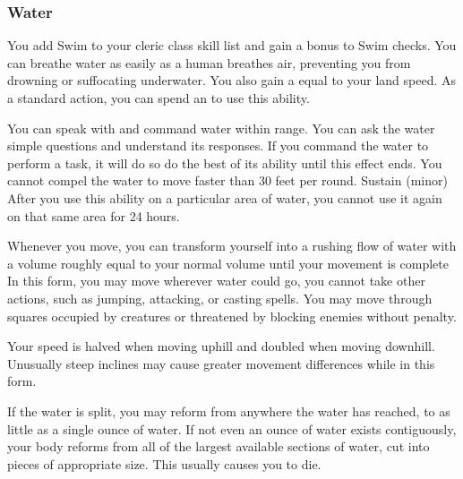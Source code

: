         \subsubsection{Water}
             You add Swim to your cleric class skill list and gain a  bonus to Swim checks.
             You can breathe water as easily as a human breathes air, preventing you from drowning or suffocating underwater.
            You also gain a  equal to your land speed.
             As a standard action, you can spend an  to use this ability.
            \begin{ability}
                \begin{spelltargetinginfo}
                    \spellrng{\rnglong}
                \end{spelltargetinginfo}
                \begin{spelleffects}
                    \spelleffect You can speak with and command water within range.
                    You can ask the water simple questions and understand its responses.
                    If you command the water to perform a task, it will do so do the best of its ability until this effect ends.
                    You cannot compel the water to move faster than 30 feet per round.
                    \spelldur Sustain (minor)
                    \spellspecial After you use this ability on a particular area of water, you cannot use it again on that same area for 24 hours.
                \end{spelleffects}
            \end{ability}
            Whenever you move, you can transform yourself into a rushing flow of water with a volume roughly equal to your normal volume until your movement is complete
            In this form, you may move wherever water could go, you cannot take other actions, such as jumping, attacking, or casting spells.
            You may move through squares occupied by creatures or threatened by blocking enemies without penalty.
            \par Your speed is halved when moving uphill and doubled when moving downhill.
            Unusually steep inclines may cause greater movement differences while in this form.
            \par If the water is split, you may reform from anywhere the water has reached, to as little as a single ounce of water.
            If not even an ounce of water exists contiguously, your body reforms from all of the largest available sections of water, cut into pieces of appropriate size.
            This usually causes you to die.

